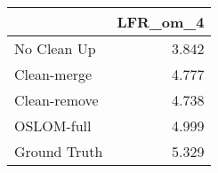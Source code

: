 \begin{tabular}{lr}
\toprule
{} & LFR_om_4 \\
\midrule
No Clean Up  &    3.842 \\
Clean-merge  &    4.777 \\
Clean-remove &    4.738 \\
OSLOM-full   &    4.999 \\
Ground Truth &    5.329 \\
\bottomrule
\end{tabular}
